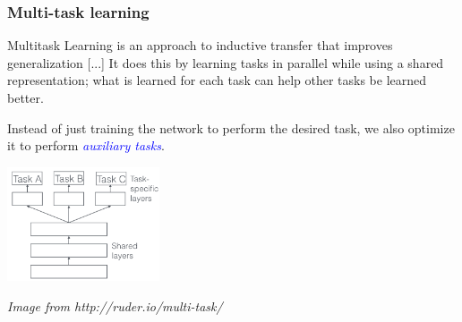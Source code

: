 \documentclass[10pt]{beamer}
\begin{document}
\begin{frame}
  \frametitle{Multi-task learning}

  \bigskip


  \begin{displayquote}
    Multitask Learning is an approach to inductive transfer that
    improves generalization [...] It
    does this by learning tasks in parallel while using a shared
    representation; what is learned for each task can help other tasks
    be learned better.
  \end{displayquote}

  \bigskip

  Instead of just training the network to perform the desired task, we
  also optimize it to perform \textcolor{blue}{\emph{auxiliary
      tasks}}.

  \begin{center}
    \includegraphics[width = 4.5cm]{images/multi_task_learning.png}
  \end{center}

  {\scriptsize \textit{Image from http://ruder.io/multi-task/}}
\end{frame}
\end{document}
